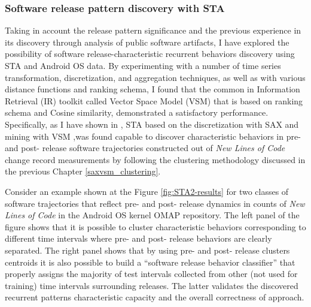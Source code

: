 \subsubsection{Software release pattern discovery with STA}
Taking in account the release pattern significance and the previous experience in its discovery through analysis of public software artifacts, I have explored the possibility of software release-characteristic recurrent behaviors discovery using STA and Android OS  data. By experimenting with a number of time series transformation, discretization, and aggregation techniques, as well as with  various distance functions and ranking schema, I found that the common in Information Retrieval (IR) toolkit called Vector Space Model  (VSM) \cite{citeulike:300428} that is based on \tfidf ranking schema and Cosine similarity, demonstrated a satisfactory performance.  Specifically, as I have shown in \cite{csdl2-11-10}, STA based on the discretization with SAX \cite{sax} and mining with VSM  \cite{citeulike:300428},was found capable to discover characteristic behaviors in pre- and post- release software trajectories  constructed out of \textit{New Lines of Code} change record measurements by following the clustering methodology discussed in the previous Chapter \ref{saxvsm_clustering}. 

Consider an example shown at the Figure \ref{fig:STA2-results} for two classes of software trajectories that reflect pre- and post- 
release dynamics in counts of \textit{New Lines of Code} in the Android OS kernel OMAP repository. The left panel of the figure shows that it is possible to cluster characteristic behaviors corresponding to different time intervals where pre- and post- release behaviors are clearly separated. The right panel shows that by using pre- and post- release clusters centroids it is also possible to build a ``software release behavior classifier'' that properly assigns the majority of test intervals collected from other (not used for training) time intervals surrounding releases. The latter validates the discovered recurrent patterns characteristic capacity and the overall correctness of approach.

